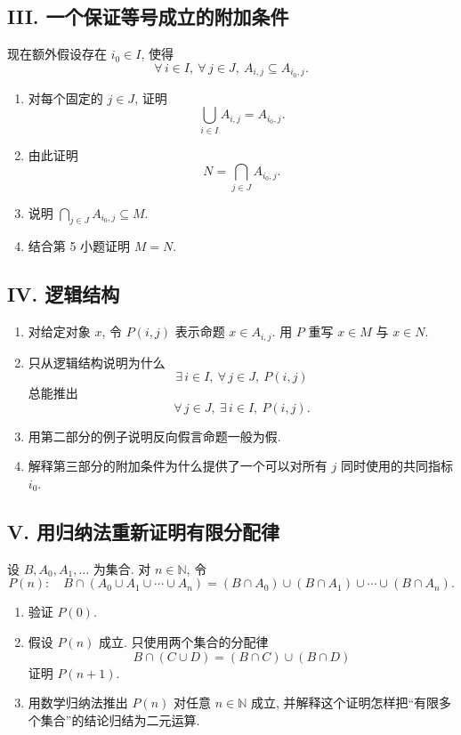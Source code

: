 \documentclass[usesamecnt, thmcnt=section, lang=cn, newtx, 10pt, scheme=chinese]{elegantbook}
\begin{document}
\subsection*{III. 一个保证等号成立的附加条件}
现在额外假设存在 $i_0\in I$, 使得
\[
 \forall\,i\in I,\ \forall\,j\in J,\ A_{i,j}\subseteq A_{i_0,j}.
\]
\begin{enumerate}[label=\textbf{\arabic*.}, resume=sets-comprehensive]
  \item 对每个固定的 $j\in J$, 证明
  \[
   \bigcup_{i\in I}A_{i,j}=A_{i_0,j}.
  \]
  \item 由此证明
  \[
   N=\bigcap_{j\in J}A_{i_0,j}.
  \]
  \item 说明 $\bigcap_{j\in J}A_{i_0,j}\subseteq M$.
  \item 结合第 5 小题证明 $M=N$.
\end{enumerate}

\subsection*{IV. 逻辑结构}
\begin{enumerate}[label=\textbf{\arabic*.}, resume=sets-comprehensive]
  \item 对给定对象 $x$, 令 $P(i,j)$ 表示命题 $x\in A_{i,j}$. 用 $P$ 重写 $x\in M$ 与 $x\in N$.
  \item 只从逻辑结构说明为什么
  \[
   \exists\,i\in I,\ \forall\,j\in J,\ P(i,j)
  \]
  总能推出
  \[
   \forall\,j\in J,\ \exists\,i\in I,\ P(i,j).
  \]
  \item 用第二部分的例子说明反向假言命题一般为假.
  \item 解释第三部分的附加条件为什么提供了一个可以对所有 $j$ 同时使用的共同指标 $i_0$.
\end{enumerate}

\subsection*{V. 用归纳法重新证明有限分配律}
设 $B,A_0,A_1,\ldots$ 为集合. 对 $n\in\mathbb N$, 令
\[
 P(n):
 \quad
 B\cap(A_0\cup A_1\cup\cdots\cup A_n)
 =
 (B\cap A_0)\cup(B\cap A_1)\cup\cdots\cup(B\cap A_n).
\]
\begin{enumerate}[label=\textbf{\arabic*.}, resume=sets-comprehensive]
  \item 验证 $P(0)$.
  \item 假设 $P(n)$ 成立. 只使用两个集合的分配律
  \[
   B\cap(C\cup D)=(B\cap C)\cup(B\cap D)
  \]
  证明 $P(n+1)$.
  \item 用数学归纳法推出 $P(n)$ 对任意 $n\in\mathbb N$ 成立, 并解释这个证明怎样把``有限多个集合''的结论归结为二元运算.
\end{enumerate}
\end{document}
